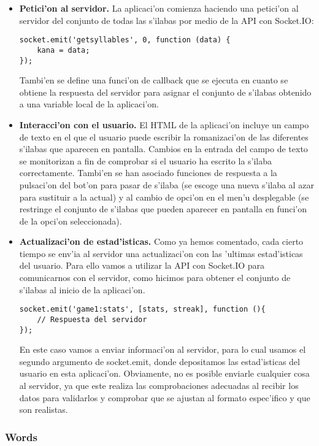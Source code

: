 \begin{itemize}
\item \textbf{Petici'on al servidor.} La aplicaci'on comienza haciendo una petici'on al servidor del conjunto de todas las 
s'ilabas por medio de la API con Socket.IO:

\begin{verbatim}
socket.emit('getsyllables', 0, function (data) {
    kana = data;
});
\end{verbatim}

Tambi'en se define una funci'on de callback que se ejecuta en cuanto se obtiene la respuesta del servidor para asignar
el conjunto de s'ilabas obtenido a una variable local de la aplicaci'on.
\item \textbf{Interacci'on con el usuario.} El HTML de la aplicaci'on incluye un campo de texto en el que el usuario puede
escribir la romanizaci'on de las diferentes s'ilabas que aparecen en pantalla. Cambios en la entrada del campo de
texto se monitorizan a fin de comprobar si el usuario ha escrito la s'ilaba correctamente.
Tambi'en se han asociado funciones de respuesta a la pulsaci'on del bot'on para pasar de s'ilaba (se escoge una nueva
s'ilaba al azar para sustituir a la actual) y al cambio de opci'on en el men'u desplegable (se restringe el conjunto
de s'ilabas que pueden aparecer en pantalla en funci'on de la opci'on seleccionada).
\item \textbf{Actualizaci'on de estad'isticas.} Como ya hemos comentado, cada cierto tiempo se env'ia al servidor una 
actualizaci'on con las 'ultimas estad'isticas del usuario. Para ello vamos a utilizar la API con Socket.IO para 
comunicarnos con el servidor, como hicimos para obtener el conjunto de s'ilabas al inicio de la aplicaci'on.

\begin{verbatim}
socket.emit('game1:stats', [stats, streak], function (){
    // Respuesta del servidor
});
\end{verbatim}

En este caso vamos a enviar informaci'on al servidor, para lo cual usamos el segundo argumento de socket.emit, donde
depositamos las estad'isticas del usuario en esta aplicaci'on.
Obviamente, no es posible enviarle cualquier cosa al servidor, ya que este realiza las comprobaciones adecuadas al
recibir los datos para validarlos y comprobar que se ajustan al formato espec'ifico y que son realistas.
\end{itemize}

\subsubsection{Words}
\label{sub:words}

